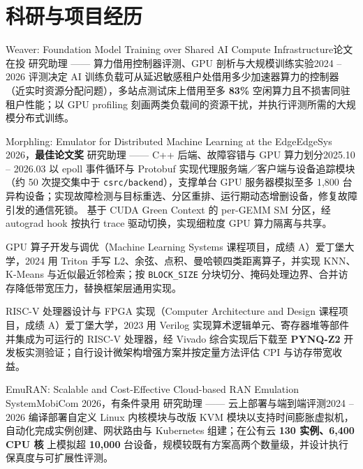 \section{科研与项目经历}
  \resumeSubHeadingListStart

    \resumeSubheading
      {Weaver: Foundation Model Training over Shared AI Compute Infrastructure}{论文在投}
      {研究助理 —— 算力借用控制器评测、GPU 剖析与大规模训练实验}{2024 -- 2026}
      \resumeItemListStart
          {评测决定 AI 训练负载可从延迟敏感租户处借用多少加速器算力的控制器（近实时资源分配问题），多站点测试床上借用至多 \textbf{83\%} 空闲算力且不损害同驻租户性能；以 GPU profiling 刻画两类负载间的资源干扰，并执行评测所需的大规模分布式训练。}
      \resumeItemListEnd

    \resumeSubheading
      {Morphling: Emulator for Distributed Machine Learning at the Edge}{EdgeSys 2026，\textbf{最佳论文奖}}
      {研究助理 —— C++ 后端、故障容错与 GPU 算力划分}{2025.10 -- 2026.03}
      \resumeItemListStart
          {以 epoll 事件循环与 Protobuf 实现代理服务端／客户端与设备追踪模块（约 50 次提交集中于 \texttt{csrc/backend}），支撑单台 GPU 服务器模拟至多 1{,}800 台异构设备；实现故障检测与目标重选、分区重排、运行期动态增删设备，修复故障引发的通信死锁。}
          {基于 CUDA Green Context 的 per-GEMM SM 分区，经 autograd hook 按执行 trace 驱动切换，实现细粒度 GPU 算力隔离与共享。}
      \resumeItemListEnd

    \resumeCompact
      {GPU 算子开发与调优（Machine Learning Systems 课程项目，成绩 A）}{爱丁堡大学，2024}
      {用 Triton 手写 L2、余弦、点积、曼哈顿四类距离算子，并实现 KNN、K-Means 与近似最近邻检索；按 \texttt{BLOCK\_SIZE} 分块切分、掩码处理边界、合并访存降低带宽压力，替换框架层通用实现。}

    \resumeCompact
      {RISC-V 处理器设计与 FPGA 实现（Computer Architecture and Design 课程项目，成绩 A）}{爱丁堡大学，2023}
      {用 Verilog 实现算术逻辑单元、寄存器堆等部件并集成为可运行的 RISC-V 处理器，经 Vivado 综合实现后下载至 \textbf{PYNQ-Z2} 开发板实测验证；自行设计微架构增强方案并按定量方法评估 CPI 与访存带宽收益。}

    \resumeSubheading
      {EmuRAN: Scalable and Cost-Effective Cloud-based RAN Emulation System}{MobiCom 2026，有条件录用}
      {研究助理 —— 云上部署与端到端评测}{2024 -- 2026}
      \resumeItemListStart
          {编译部署自定义 Linux 内核模块与改版 KVM 模块以支持时间膨胀虚拟机，自动化完成实例创建、网状路由与 Kubernetes 组建；在公有云 \textbf{130 实例、6{,}400 CPU 核} 上模拟超 \textbf{10{,}000} 台设备，规模较既有方案高两个数量级，并设计执行保真度与可扩展性评测。}
      \resumeItemListEnd

  \resumeSubHeadingListEnd
